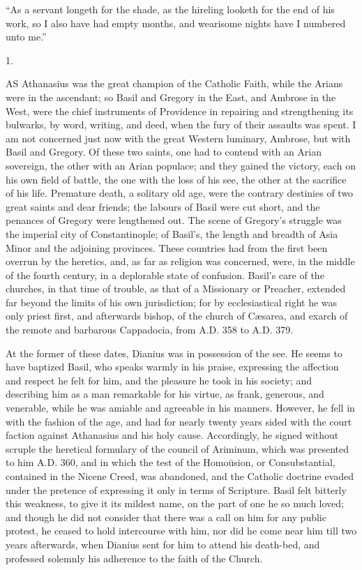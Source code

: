 
``As a servant longeth for the shade, as the hireling
looketh for the end of his work, so I also have had empty months, and
wearisome nights have I numbered unto me.''

1.

AS Athanasius was the great champion of the
Catholic Faith, while the Arians were in the ascendant; so Basil and
Gregory in the East, and Ambrose in the West, were the chief
instruments of Providence in repairing and strengthening its bulwarks,
by word, writing, and deed, when the fury of their assaults was spent.
I am not concerned just now with the great Western luminary, Ambrose,
but with Basil and Gregory. Of these two saints, one had to contend
with an Arian sovereign, the other with an Arian populace; and they
gained the victory, each on his own field of battle, the one with the
loss of his see, the other at the sacrifice of his life. Premature
death, a solitary old age, were the contrary destinies of two great
saints and dear friends; the labours of Basil were cut short, and the
penances of Gregory were lengthened out. The scene of Gregory's
struggle was the imperial city of Constantinople; of Basil's, the
length and breadth of Asia Minor and the adjoining provinces. These
countries had from the first been overrun by the heretics, and, as far
as religion was concerned, were, in the middle of the fourth
century, in a deplorable state of confusion. Basil's care of the
churches, in that time of trouble, as that of a Missionary or
Preacher, extended far beyond the limits of his own jurisdiction; for
by ecclesiastical right he was only priest first, and afterwards
bishop, of the church of Cæsarea, and exarch of the remote and
barbarous Cappadocia, from A.D. 358 to A.D.
379.

At the former of these dates, Dianius was in possession of the see.
He seems to have baptized Basil, who speaks warmly in his praise,
expressing the affection and respect he felt for him, and the pleasure
he took in his society; and describing him as a man remarkable for his
virtue, as frank, generous, and venerable, while he was amiable and
agreeable in his manners. However, he fell in with the fashion of the
age, and had for nearly twenty years sided with the court faction
against Athanasius and his holy cause. Accordingly, he signed without
scruple the heretical formulary of the council of Ariminum, which was
presented to him A.D. 360, and in which the test
of the Homoüsion, or Consubstantial, contained in the Nicene Creed,
was abandoned, and the Catholic doctrine evaded under the pretence of
expressing it only in terms of Scripture. Basil felt bitterly this
weakness, to give it its mildest name, on the part of one he so much
loved; and though he did not consider that there was a call on him for
any public protest, he ceased to hold intercourse with him, nor did he
come near him till two years afterwards, when Dianius sent for him to
attend his death-bed, and professed solemnly his adherence to the
faith of the Church.

